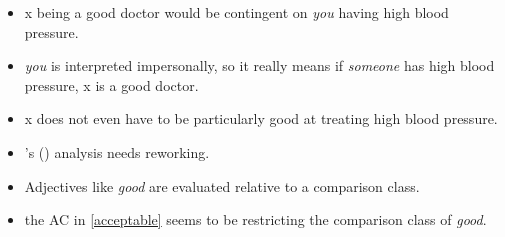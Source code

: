 \documentclass[letterpaper,12pt]{article}
\begin{document}
\begin{itemize}
	\item x being a good doctor would be contingent on \textit{you} having high blood pressure.
	\item \textit{you} is interpreted impersonally, so it really means if \textit{someone} has high blood pressure, x is a good doctor.
	\item x does not even have to be particularly good at treating high blood pressure.
	\item \citeauthor{franaappearmodality}'s (\citeyear{franaappearmodality}) analysis needs reworking.
	\item Adjectives like \textit{good} are evaluated relative to a comparison class. \parencite{klein1980semantics}
	\item the AC in \ref{acceptable} seems to be restricting the comparison class of \textit{good}.
\end{itemize}
\printbibliography
\end{document}
